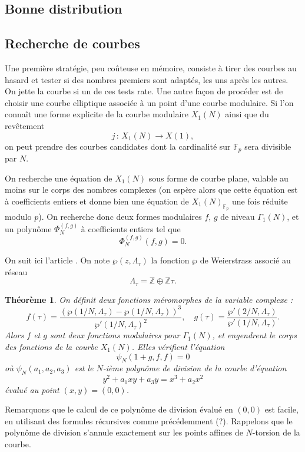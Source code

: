 \documentclass[11pt,a4paper]{article}
\newcommand{\Z}{\mathbb{Z}}
\newcommand{\F}{\mathbb{F}}
\newcommand{\vers}{\longrightarrow}
\newcommand{\de}{\,:\,}
\newtheorem*{thm}{Théorème}
\theoremstyle{definition}
\begin{document}
\subsection{Bonne distribution}


\subsection{Recherche de courbes}

Une première stratégie, peu coûteuse en mémoire, consiste à tirer des courbes au hasard et tester si des nombres premiers sont adaptés, les uns après les autres. On jette la courbe si un de ces tests rate. Une autre façon de procéder est de choisir une courbe elliptique associée à un point d'une courbe modulaire. Si l'on connaît une forme explicite de la courbe modulaire $X_1(N)$ ainsi que du revêtement
$$j\de X_1(N)\vers X(1),$$
on peut prendre des courbes candidates dont la cardinalité sur $\F_p$ sera divisible par $N$.

On recherche une équation de $X_1(N)$ sous forme de courbe plane, valable au moins sur le corps des nombres complexes (on espère alors que cette équation est à coefficients entiers et donne bien une équation de $X_1(N)_{\F_p}$ une fois réduite modulo $p$). On recherche donc deux formes modulaires $f$, $g$ de niveau $\Gamma_1(N)$, et un polynôme $\Phi_N^{(f, g)}$ à coefficients entiers tel que
$$\Phi_N^{(f, g)}(f, g) = 0.$$

On suit ici l'article \cite{Baaziz}. On note $\wp(z, \Lambda_\tau)$ la fonction $\wp$ de Weierstrass associé au réseau
$$\Lambda_\tau = \Z\oplus\Z \tau.$$

\begin{thm}
On définit deux fonctions méromorphes de la variable complexe :
$$f(\tau) = \frac{(\wp(1/N, \Lambda_\tau) - \wp(1/N, \Lambda_\tau))^3}{\wp'(1/N, \Lambda_\tau)^2}, \quad
g(\tau) = \frac{\wp'(2/N, \Lambda_\tau)}{\wp'(1/N,\Lambda_\tau)}.$$
Alors $f$ et $g$ sont deux fonctions modulaires pour $\Gamma_1(N)$, et engendrent le corps des fonctions de la courbe $X_1(N)$. Elles vérifient l'équation
$$\psi_N(1+g, f, f) = 0$$
où $\psi_N(a_1, a_2, a_3)$ est le $N$-ième polynôme de division de la courbe d'équation
$$y^2 + a_1xy + a_3y = x^3 + a_2x^2$$
évalué au point $(x, y) = (0, 0)$.
\end{thm}

Remarquons que le calcul de ce polynôme de division évalué en $(0, 0)$ est facile, en utilisant des formules récursives comme précédemment (?). Rappelons que le polynôme de division s'annule exactement sur les points affines de $N$-torsion de la courbe.
\end{document}
